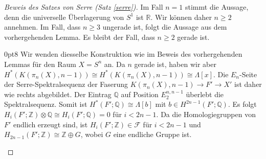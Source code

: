 \documentclass[11pt, a4paper, german]{article}
\theoremstyle{definition}
\theoremstyle{remark}
\newcommand{\R}{\mathbb{R}} %
\newcommand{\Z}{\mathbb{Z}} %
\newcommand{\Q}{\mathbb{Q}} %
\newcommand{\F}{\mathcal{F}} %
\newcommand{\zeroDot}[2]{\node[draw,circle,inner sep=0.4pt,fill] at (#1,#2) {};} %
\begin{document}
\begin{proof}[Beweis des Satzes von Serre (Satz \ref{serre})]
  Im Fall $n=1$ stimmt die Aussage, denn die universelle Überlagerung von $S^1$ ist $\R$.
  Wir können daher $n \geq 2$ annehmen.
  Im Fall, dass $n \geq 3$ ungerade ist, folgt die Aussage aus dem vorhergehenden Lemma.
  Es bleibt der Fall, dass $n \geq 2$ gerade ist.

  \vspace{2em}

  \renewcommand\windowpagestuff{
    \begin{center}\begin{tikzpicture}[x=16pt,y=16pt]\begin{scope}[shift={(0,0)}]
      \foreach \x in {1,2,3,5}{
        \foreach \y in {0,1,...,3}{
          \zeroDot{\x}{\y}
        }
      }
      \foreach \x in {0,...,5}{
        \zeroDot{\x}{4}
      }
      \node at (0,0) {$\Q$\small $1$};
      \zeroDot{0}{1}
      \zeroDot{0}{2}
      \node at (0,3) {$\Q$\small $a$};
      \node at (4,0) {$\Q$\small $x$};
      \zeroDot{4}{1}
      \zeroDot{4}{2}
      \node at (4,3) {$\Q$\small $ax$};
      \draw[->,gray] (0.6,2.6) -- (3.4,0.4);
      \draw[->] (-0.7,-0.6) -- (6,-0.6); %
      \draw[->] (-0.7,-0.6) -- (-0.7,4.5); %
      \node[left] at (-0.7,0) {$0$};
      \node[left] at (-0.9,1.7) {\vdots};
      \node[left] at (-0.7,3) {$n{-}1$};
      \node[below] at (0,-0.6) {$0$};
      \node[below] at (2,-0.7) {$\cdots$};
      \node[below] at (4,-0.7) {$n$};
    \end{scope}\end{tikzpicture}\end{center}
  }
  \opencutright
  \begin{cutout}{0}{\dimexpr\linewidth-5cm\relax}{0pt}{8}
    Wir wenden diesselbe Konstruktion wie im Beweis des vorhergehenden Lemmas für den Raum $X = S^n$ an.
    Da $n$ gerade ist, haben wir aber $H^*(K(\pi_n(X), n{-}1)) \cong H^*(K(\pi_n(X), n{-}1)) \cong \Lambda[x]$.
    Die $E_n$-Seite der Serre-Spektralsequenz der Faserung $K(\pi_n(X), n{-}1) \to F' \to X'$ ist daher wie rechts abgebildet.
    Der Eintrag $\Q$ auf Position $E_2^{n,n-1}$ überlebt die Spektralsequenz.
    Somit ist $H^*(F'; \Q) \cong \Lambda[b]$ mit $b \in H^{2n-1}(F'; \Q)$.
    Es folgt $H_i(F'; \Z) \otimes \Q \cong H_i(F'; \Q) = 0$ für $i < 2n-1$.
    Da die Homologiegruppen von $F'$ endlich erzeugt sind, ist $H_i(F'; \Z) \in \F$ für $i < 2n-1$ und $H_{2n-1}(F'; \Z) \cong \Z \oplus G$, wobei $G$ eine endliche Gruppe ist.

\end{cutout}
\end{proof}
\end{document}
